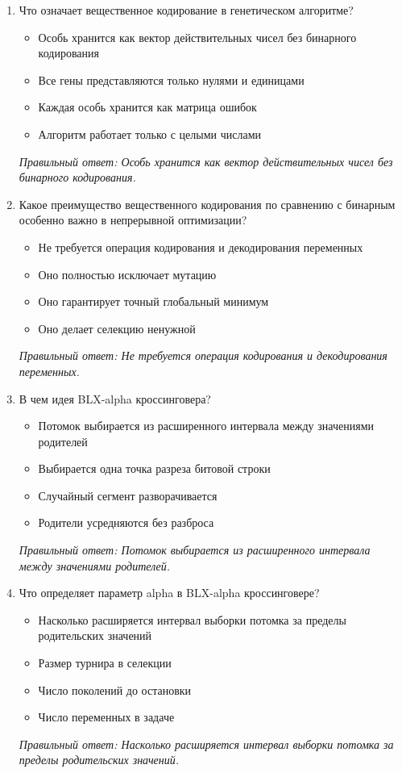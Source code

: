 \small
\begin{enumerate}[label=\textbf{\arabic*.}, leftmargin=0pt, itemsep=1.2em]
\item Что означает вещественное кодирование в генетическом алгоритме?
\begin{itemize}[label=$\square$, leftmargin=1.5cm, itemsep=0.2em, topsep=0.3em]
\item Особь хранится как вектор действительных чисел без бинарного кодирования
\item Все гены представляются только нулями и единицами
\item Каждая особь хранится как матрица ошибок
\item Алгоритм работает только с целыми числами
\end{itemize}
{\small\textit{Правильный ответ: Особь хранится как вектор действительных чисел без бинарного кодирования.}}

\item Какое преимущество вещественного кодирования по сравнению с бинарным особенно важно в непрерывной оптимизации?
\begin{itemize}[label=$\square$, leftmargin=1.5cm, itemsep=0.2em, topsep=0.3em]
\item Не требуется операция кодирования и декодирования переменных
\item Оно полностью исключает мутацию
\item Оно гарантирует точный глобальный минимум
\item Оно делает селекцию ненужной
\end{itemize}
{\small\textit{Правильный ответ: Не требуется операция кодирования и декодирования переменных.}}

\item В чем идея BLX-alpha кроссинговера?
\begin{itemize}[label=$\square$, leftmargin=1.5cm, itemsep=0.2em, topsep=0.3em]
\item Потомок выбирается из расширенного интервала между значениями родителей
\item Выбирается одна точка разреза битовой строки
\item Случайный сегмент разворачивается
\item Родители усредняются без разброса
\end{itemize}
{\small\textit{Правильный ответ: Потомок выбирается из расширенного интервала между значениями родителей.}}

\item Что определяет параметр alpha в BLX-alpha кроссинговере?
\begin{itemize}[label=$\square$, leftmargin=1.5cm, itemsep=0.2em, topsep=0.3em]
\item Насколько расширяется интервал выборки потомка за пределы родительских значений
\item Размер турнира в селекции
\item Число поколений до остановки
\item Число переменных в задаче
\end{itemize}
{\small\textit{Правильный ответ: Насколько расширяется интервал выборки потомка за пределы родительских значений.}}


\end{enumerate}
